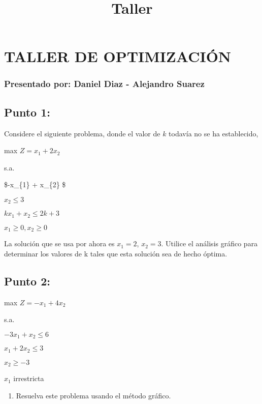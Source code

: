 \documentclass[11pt]{article}
\title{Taller}
\providecommand{\tightlist}{%
      \setlength{\itemsep}{0pt}\setlength{\parskip}{0pt}}
\begin{document}
    
    
    \maketitle
    
    

    
    \section{TALLER DE OPTIMIZACIÓN}\label{taller-de-optimizaciuxf3n}

\subsubsection{Presentado por: Daniel Diaz - Alejandro
Suarez}\label{presentado-por-daniel-diaz---alejandro-suarez}

    \subsection{Punto 1:}\label{punto-1}

Considere el siguiente problema, donde el valor de \(k\) todavía no se
ha establecido,

max \(Z = x_{1} + 2x_{2}\)

s.a.

\$-x\_\{1\} + x\_\{2\}  \$

\(x_{2} \leq 3\)

\(k x_{1} + x_{2} \leq 2k + 3\)

\(x_{1} \geq 0, x_{2} \geq 0\)

La solución que se usa por ahora es \(x_{1}=2\), \(x_{2}=3\). Utilice el
análisis gráfico para determinar los valores de k tales que esta
solución sea de hecho óptima.

    \subsection{Punto 2:}\label{punto-2}

max \(Z = -x_{1} + 4x_{2}\)

s.a.

\(-3x_{1} + x_{2} \leq 6\)

\(x_{1} + 2x_{2} \leq 3\)

\(x_{2} \geq -3\)

\(x_{1}\) irrestricta

\begin{enumerate}
\def\labelenumi{\alph{enumi})}
\tightlist
\item
  Resuelva este problema usando el método gráfico.
\end{enumerate}
\end{document}
